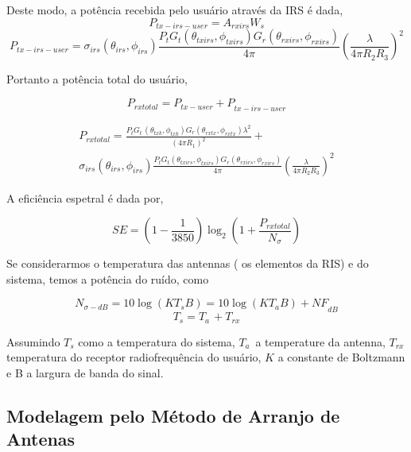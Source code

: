 \documentclass[
	12pt,				%
	openright,			%
	oneside,			%
	a4paper,			%
	english,			%
	brazil				%
	]{abntex2}
\begin{document}
Deste modo, a potência recebida pelo usuário através da IRS é dada,
\begin{equation}
    P_{tx-irs-user} = A_{rxirs}W_{s}
\end{equation}
\begin{equation}
    P_{tx - irs - user} = \sigma_{irs}\left( \theta_{irs},\phi_{irs} \right)\frac{P_{t}G_{t}(\theta_{txirs},\phi_{txirs})G_{r}\left( \theta_{rxirs},\phi_{rxirs} \right)}{4\pi}\left( \frac{\lambda}{4\pi R_{2}R_{3}} \right)^{2}
\end{equation}

Portanto a potência total do usuário,

\begin{equation}
    {P_{rxtotal} = P_{tx -user} + P}_{tx-irs-user}
\end{equation}

\begin{align}
    P_{rxtotal} = \frac{P_{t}G_{t\ }\left( \theta_{txk},\phi_{txk} \right)G_{r}\left( \theta_{rxtx},\phi_{rxtx} \right)\lambda^{2}}{\left( 4\pi R_{1} \right)^{2}} + \\
\sigma_{irs}\left( \theta_{irs},\phi_{irs} \right)\frac{P_{t}G_{t}(\theta_{txirs},\phi_{txirs})G_{r}\left( \theta_{rxirs},\phi_{rxirs} \right)}{4\pi}\left( \frac{\lambda}{4\pi R_{2}R_{3}} \right)^{2}

\end{align}


A eficiência espetral é dada por,

\begin{equation}
SE = \left( 1 - \frac{1}{3850} \right)\log_2\left( 1 + \frac{P_{rxtotal}}{N_{\sigma}} \right)    
\end{equation}

Se considerarmos o temperatura das antennas ( os elementos da RIS) e do sistema, temos a potência do ruído, como

\begin{equation}
  N_{\sigma - dB} = 10\log{\left( KT_{s}B \right) =}10{\log{\left( KT_{a}B \right) + NF}}_{dB}  
\end{equation}
\begin{equation}
    T_{s} = T_{a\ } + T_{rx}
\end{equation}

Assumindo $T_{s}$ como a temperatura do sistema, $T_{a\ }$ a temperature da antenna, $T_{rx}$ temperatura do receptor radiofrequência do usuário, $K$ a constante de Boltzmann e B a largura de banda do sinal.


\subsection{Modelagem pelo Método de Arranjo de Antenas}\label{FormulaçãoArrayBalanis}
\end{document}
